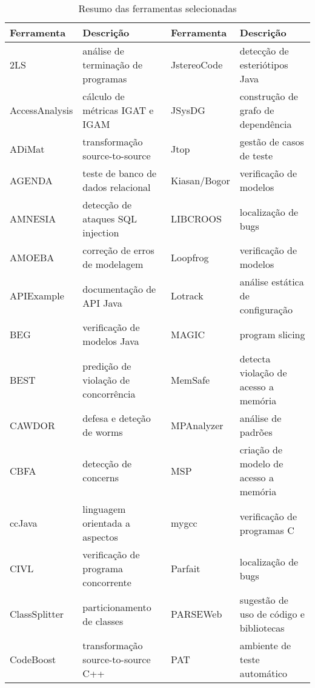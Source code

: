 \begin{table}[h]
{\scriptsize
\caption{Resumo das ferramentas selecionadas}
\centering
\begin{tabular}{| l | l | l | l |}
  \hline
  Ferramenta     & Descrição                            & Ferramenta       & Descrição                            \\
  \hline
  2LS            & análise de terminação de programas   & JstereoCode      & detecção de esteriótipos Java        \\
  AccessAnalysis & cálculo de métricas IGAT e IGAM      & JSysDG           & construção de grafo de dependência   \\
  ADiMat         & transformação source-to-source       & Jtop             & gestão de casos de teste             \\
  AGENDA         & teste de banco de dados relacional   & Kiasan/Bogor     & verificação de modelos               \\
  AMNESIA        & detecção de ataques SQL injection    & LIBCROOS         & localização de bugs                  \\
  AMOEBA         & correção de erros de modelagem       & Loopfrog         & verificação de modelos               \\
  APIExample     & documentação de API Java             & Lotrack          & análise estática de configuração     \\
  BEG            & verificação de modelos Java          & MAGIC            & program slicing                      \\
  BEST           & predição de violação de concorrência & MemSafe          & detecta violação de acesso a memória \\
  CAWDOR         & defesa e deteção de worms            & MPAnalyzer       & análise de padrões                   \\
  CBFA           & detecção de concerns                 & MSP              & criação de modelo de acesso a memória \\
  ccJava         & linguagem orientada a aspectos       & mygcc            & verificação de programas C           \\
  CIVL           & verificação de programa concorrente  & Parfait          & localização de bugs                  \\
  ClassSplitter  & particionamento de classes           & PARSEWeb         & sugestão de uso de código e bibliotecas \\
  CodeBoost      & transformação source-to-source C++   & PAT              & ambiente de teste automático         \\

\end{tabular}}
\end{table}
